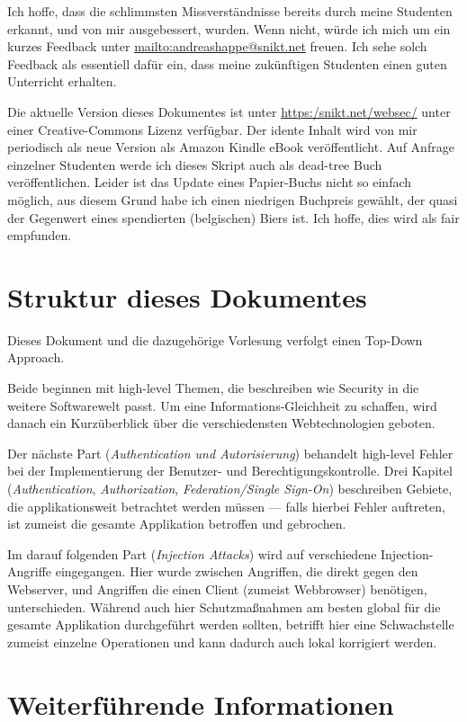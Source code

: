 Ich hoffe, dass die schlimmsten Missverständnisse bereits durch meine Studenten erkannt, und von mir ausgebessert, wurden. Wenn nicht, würde ich mich um ein kurzes Feedback unter \url{mailto:andreashappe@snikt.net} freuen. Ich sehe solch Feedback als essentiell dafür ein, dass meine zukünftigen Studenten einen guten Unterricht erhalten.

Die aktuelle Version dieses Dokumentes ist unter \url{https:/snikt.net/websec/} unter einer Creative-Commons Lizenz verfügbar. Der idente Inhalt wird von mir periodisch als neue Version als Amazon Kindle eBook veröffentlicht. Auf Anfrage einzelner Studenten werde ich dieses Skript auch als dead-tree Buch veröffentlichen. Leider ist das Update eines Papier-Buchs nicht so einfach möglich, aus diesem Grund habe ich einen niedrigen Buchpreis gewählt, der quasi der Gegenwert eines spendierten (belgischen) Biers ist. Ich hoffe, dies wird als fair empfunden.

\section{Struktur dieses Dokumentes}

Dieses Dokument und die dazugehörige Vorlesung verfolgt einen Top-Down Approach.

Beide beginnen mit high-level Themen, die beschreiben wie Security in die weitere Softwarewelt passt. Um eine Informations-Gleichheit zu schaffen, wird danach ein Kurzüberblick über die verschiedensten Webtechnologien geboten.

Der nächste Part (\textit{Authentication und Autorisierung}) behandelt high-level Fehler bei der Implementierung der Benutzer- und Berechtigungskontrolle. Drei Kapitel (\textit{Authentication}, \textit{Authorization}, \textit{Federation/Single Sign-On}) beschreiben Gebiete, die applikationsweit betrachtet werden müssen --- falls hierbei Fehler auftreten, ist zumeist die gesamte Applikation betroffen und gebrochen.

Im darauf folgenden Part (\textit{Injection Attacks}) wird auf verschiedene Injection-Angriffe eingegangen. Hier wurde zwischen Angriffen, die direkt gegen den Webserver, und Angriffen die einen Client (zumeist Webbrowser) benötigen, unterschieden. Während auch hier Schutzmaßnahmen am besten global für die gesamte Applikation durchgeführt werden sollten, betrifft hier eine Schwachstelle zumeist einzelne Operationen und kann dadurch auch lokal korrigiert werden.

\section{Weiterführende Informationen}

